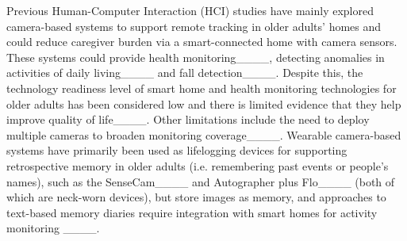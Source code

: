 Previous Human-Computer Interaction (HCI) studies have mainly explored camera-based systems to support remote tracking in older adults' homes and could reduce caregiver burden via a smart-connected home with camera sensors. These systems could provide health monitoring____, detecting anomalies in activities of daily living____ and fall detection____.
Despite this, the technology readiness level of smart home and health monitoring technologies for older adults has been considered low and there is limited evidence that they help improve quality of life____. Other limitations include the need to deploy multiple cameras to broaden monitoring coverage____. %
Wearable camera-based systems have primarily been used as lifelogging devices for supporting retrospective memory in older adults (i.e. remembering past events or people's names), such as the SenseCam____ and Autographer plus Flo____ (both of which are neck-worn devices), but store images as memory, and approaches to text-based memory diaries require integration with smart homes for activity monitoring ____.

